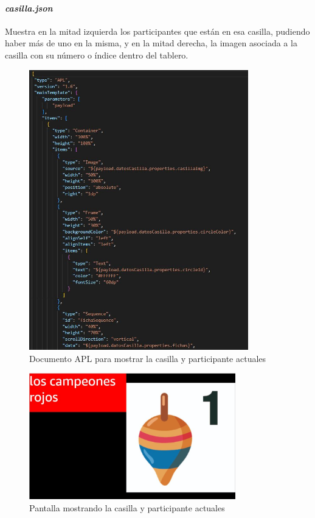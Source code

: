 \paragraph{\textit{casilla.json}}

Muestra en la mitad izquierda los participantes que están en esa casilla, pudiendo haber más de uno en la misma, y en la mitad derecha, la imagen asociada a la casilla con su número o índice dentro del tablero.

\begin{figure}[H]
	\centering
	\includegraphics[width=0.85\textwidth]{imgs/apl-casilla.jpg}
	\caption{Documento APL para mostrar la casilla y participante actuales}
	\label{fig:apl-casilla}
\end{figure}

\begin{figure}[H]
	\centering
	\includegraphics[width=0.8\textwidth]{imgs/interfaz-4.jpg}
	\caption{Pantalla mostrando la casilla y participante actuales}
	\label{fig:interfaz-4}
\end{figure}

